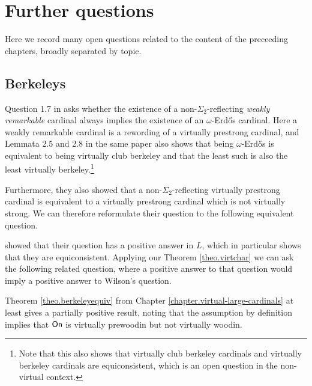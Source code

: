 \documentclass[../../main]{subfiles}
\begin{document}
\chapter{Further questions}
\thispagestyle{fancy}

Here we record many open questions related to the content of the preceeding chapters, broadly separated by topic.

\section{Berkeleys}

Question 1.7 in \cite{RemarkableWilson} asks whether the existence of a non-$\Sigma_2$-reflecting \textit{weakly remarkable} cardinal always implies the existence of an $\omega$-Erd\H os cardinal. Here a weakly remarkable cardinal is a rewording of a virtually prestrong cardinal, and Lemmata 2.5 and 2.8 in the same paper also shows that being $\omega$-Erd\H os is equivalent to being virtually club berkeley and that the least such is also the least virtually berkeley.\footnote{Note that this also shows that virtually club berkeley cardinals and virtually berkeley cardinals are equiconsistent, which is an open question in the non-virtual context.}

\qquad Furthermore, they also showed that a non-$\Sigma_2$-reflecting virtually prestrong cardinal is equivalent to a virtually prestrong cardinal which is not virtually strong. We can therefore reformulate their question to the following equivalent question.


\cite{RemarkableWilson} showed that their question has a positive answer in $L$, which in particular shows that they are equiconsistent. Applying our Theorem \ref{theo.virtchar} we can ask the following related question, where a positive answer to that question would imply a positive answer to Wilson's question.


Theorem \ref{theo.berkeleyequiv} from Chapter \ref{chapter.virtual-large-cardinals} at least gives a partially positive result, noting that the assumption by definition implies that $\textsf{On}$ is virtually prewoodin but not virtually woodin.
\end{document}

